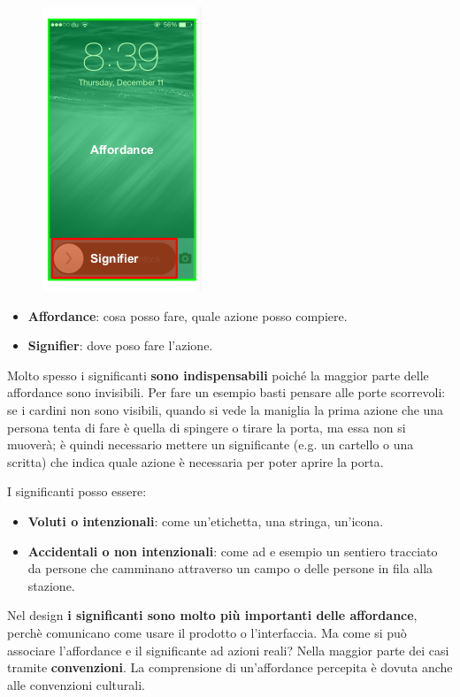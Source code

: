 \documentclass[a4paper,11pt,oneside]{book}
\begin{document}
\begin{figure}[!h]
	\centering
	\includegraphics[scale = 0.7]{"immagini/Affordance vs Signifier"}
\end{figure}
\begin{itemize}
	\item \textbf{Affordance}: cosa posso fare, quale azione posso compiere.
	\item \textbf{Signifier}: dove poso fare l'azione.
\end{itemize}
Molto spesso i significanti \textbf{sono indispensabili} poiché la maggior parte delle affordance sono invisibili. Per fare un esempio basti pensare alle porte scorrevoli: se i cardini non sono visibili, quando si vede la maniglia la prima azione che una persona tenta di fare è quella di spingere o tirare la porta, ma essa non si muoverà; è quindi necessario mettere un significante (e.g. un cartello o una scritta) che indica quale azione è necessaria per poter aprire la porta.

I significanti posso essere:
\begin{itemize}
	\item \textbf{Voluti o intenzionali}: come un'etichetta, una stringa, un'icona.
	\item \textbf{Accidentali o non intenzionali}: come ad e esempio un sentiero tracciato da persone che camminano attraverso un campo o delle persone in fila alla stazione.
\end{itemize}
Nel design \textbf{i significanti sono molto più importanti delle affordance}, perchè comunicano come usare il prodotto o l'interfaccia. Ma come si può associare l'affordance e il significante ad azioni reali? Nella maggior parte dei casi tramite \textbf{convenzioni}. La comprensione di un'affordance percepita è dovuta anche alle convenzioni culturali.
\end{document}
